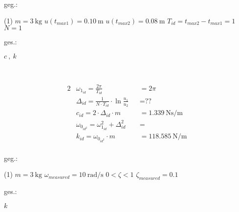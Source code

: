 


    \begin{minipage}[t]{.49\linewidth}
        geg.:
        \begin{tasks} (1)
           \task[] $m = \SI{3}{\kilo\gram}$
           \task[] $u(t_{max1}) = \SI{0.10}{\meter}$
           \task[] $u(t_{max2}) = \SI{0.08}{\meter}$
           \task[] $T_{id} = t_{max2}-t_{max1} = 1$
           \task[] $N = 1$
        \end{tasks}
        \end{minipage}
        \begin{minipage}[t]{.49\linewidth}
        ges.:
        \begin{tasks}
            \task$c ~,~ k$
        \end{tasks}
    \end{minipage}\\
    \vspace{1cm}


    \begin{solution}
        \begin{alignat*}{2}
            &\omega_{1_{id}} = \frac{2 \pi}{T_{id}} &&= 2 \pi\\
            &\Delta_{id} = \frac{1}{N \cdot T_{id} } \cdot \ln{\frac{u_1}{u_2}} &&= \text{??}\\
            &c_{id} = 2 \cdot \Delta_{id} \cdot m &&= \SI{1.339}{\newton \second \per \meter}\\
            &\omega_{0_{id^2}} = \omega_{1_{id}}^2 + \Delta_{id}^2 &&= \\
            &k_{id} = \omega_{0_{id^2}} \cdot m &&= \SI{118.585}{\newton \per \meter}\\
        \end{alignat*}
    \end{solution}



\begin{minipage}[t]{.49\linewidth}
    geg.:
    \begin{tasks} (1)
        \task[] $m = \SI{3}{\kilo\gram}$
        \task[] $\omega_{measured} = \SI{10}{\radian\per\second}$
        \task[] $0 < \zeta < 1$
        \task[] $\zeta_{measured} = 0.1$
    \end{tasks}
    \end{minipage}
    \begin{minipage}[t]{.49\linewidth}
    ges.:
    \begin{tasks}
        \task$k$
    \end{tasks}
\end{minipage}\\
\vspace{1cm}

